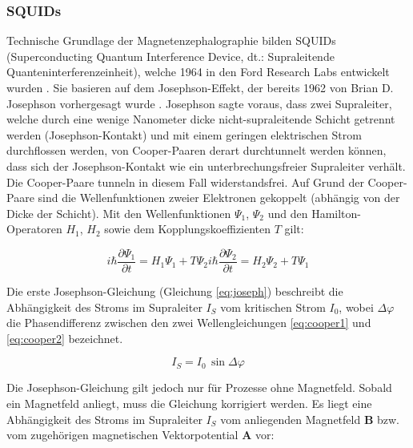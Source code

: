\documentclass[doc,a4paper,12pt]{apa6}
\newcommand{\mx}[1]{\mathbf{#1}}
\begin{document}
\subsubsection{SQUIDs}
\label{sec:squids}

Technische Grundlage der Magnetenzephalographie bilden SQUIDs (Superconducting Quantum Interference Device, dt.: Supraleitende Quanteninterferenzeinheit), welche 1964 in den Ford Research Labs entwickelt wurden \parencite{jaklevic1964quantum}. Sie basieren auf dem Josephson-Effekt, der bereits 1962 von Brian D. Josephson vorhergesagt wurde \parencite{josephson1962possible}. Josephson sagte voraus, dass zwei Supraleiter, welche durch eine wenige Nanometer dicke nicht-supraleitende Schicht getrennt werden (Josephson-Kontakt) und mit einem geringen elektrischen Strom durchflossen werden, von Cooper-Paaren derart durchtunnelt werden können, dass sich der Josephson-Kontakt wie ein unterbrechungsfreier Supraleiter verhält. Die Cooper-Paare tunneln in diesem Fall widerstandsfrei.
Auf Grund der Cooper-Paare sind die Wellenfunktionen zweier Elektronen gekoppelt (abhängig von der Dicke der Schicht). Mit den Wellenfunktionen $\Psi_1$, $\Psi_2$ und den Hamilton-Operatoren $H_1$, $H_2$ sowie dem Kopplungskoeffizienten $T$ gilt:

\begin{subequations}
\label{eq:cooper}
  \begin{equation} i\hbar \frac{\partial \Psi_1}{\partial t} = H_1 \Psi_1 + T \Psi_2 \label{eq:cooper1}\end{equation}
   \begin{equation} i\hbar \frac{\partial \Psi_2}{\partial t} = H_2 \Psi_2 + T \Psi_1 \label{eq:cooper2}\end{equation}
\end{subequations}

Die erste Josephson-Gleichung (Gleichung \ref{eq:joseph}) beschreibt die Abhängigkeit des Stroms im Supraleiter $I_S$ vom kritischen Strom $I_0$, wobei $\Delta \varphi$ die Phasendifferenz zwischen den zwei Wellengleichungen \ref{eq:cooper1} und \ref{eq:cooper2} bezeichnet.

\begin{equation}
\label{eq:joseph}
I_S = I_0\,\sin{\Delta \varphi}
\end{equation}

Die Josephson-Gleichung gilt jedoch nur für Prozesse ohne Magnetfeld. Sobald ein Magnetfeld anliegt, muss die Gleichung korrigiert werden. Es liegt eine Abhängigkeit des Stroms im Supraleiter $I_S$ vom anliegenden Magnetfeld $\mx{B}$ bzw. vom zugehörigen magnetischen Vektorpotential $\mx{A}$ vor:
\end{document}
